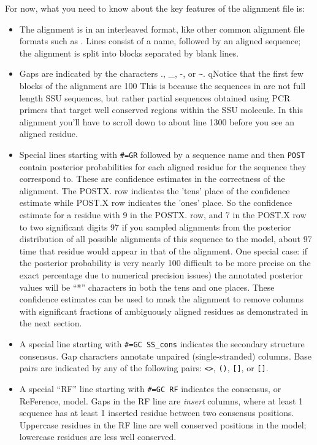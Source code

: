 For now, what you need to know about the key features of the alignment file is:
\begin{itemize}

\item The alignment is in an interleaved format, like other
  common alignment file formats such as .
  Lines consist of a name, followed by an aligned sequence;
  the alignment is split into blocks separated by blank lines.

\item Gaps are indicated by the characters ., \_, -, or \verb+~+.
  qNotice that the first few blocks of the alignment are 100%
  This is because the sequences in  are not full length
  SSU sequences, but rather partial sequences obtained using PCR
  primers that target well conserved regions within the SSU
  molecule. In this alignment you'll have to scroll down to about line
  1300 before you see an aligned residue.

\item Special lines starting with {\small\verb+#=GR+} followed by a
  sequence name and then {\small\verb+POST+} contain posterior
  probabilities for each aligned residue for the sequence they
  correspond to. These are confidence estimates in the correctness of
  the alignment.  The POSTX. row indicates the ’tens’ place of the
  confidence estimate while POST.X row indicates the ’ones’ place. So
  the confidence estimate for a residue with 9 in the POSTX. row, and
  7 in the POST.X row to two significant digits 97%
  if you sampled alignments from the posterior distribution of all
  possible alignments of this sequence to the model, about 97%
  time that residue would appear in that of the alignment. One special
  case: if the posterior probability is very nearly 100%
  difficult to be more precise on the exact percentage due to
  numerical precision issues) the annotated posterior values will be
  ``*'' characters in both the tens and one places. These confidence
  estimates can be used to mask the alignment to remove columns with
  significant fractions of ambiguously aligned residues as demonstrated
  in the next section.

\item A special line starting with {\small\verb+#=GC SS_cons+}
  indicates the secondary structure consensus. Gap characters annotate
  unpaired (single-stranded) columns. Base pairs are indicated by any
  of the following pairs: \verb+<>+, \verb+()+, \verb+[]+, or
  \verb+[]+.

\item A special ``RF'' line starting with {\small\verb+#=GC RF+}
  indicates the consensus, or ReFerence, model. Gaps in the RF line
  are \emph{insert} columns, where at least 1 sequence has at least 1
  inserted residue between two consensus positions. Uppercase residues
  in the RF line are well conserved positions in the model; lowercase
  residues are less well conserved.
\end{itemize}

